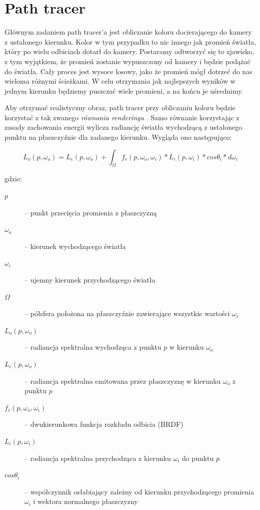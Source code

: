 \documentclass[inz,longabstract]{iithesis}
\begin{document}
    \section{Path tracer}
        Głównym zadaniem path tracer'a jest obliczanie koloru docierającego do kamery z ustalonego kierunku. Kolor w tym przypadku to nic innego jak promień światła, który po wielu odbiciach dotarł do kamery. Postaramy odtworzyć się to zjawisko, z tym wyjątkiem, że promień zostanie wypuszczony od kamery i będzie podążać do światła. Cały proces jest wysoce losowy, jako że promień mógł dotrzeć do nas wieloma różnymi ścieżkami. W celu otrzymania jak najlepszych wyników w jednym kierunku będziemy puszczać wiele promieni, a na końcu je uśrednimy.
        
        Aby otrzymać realistyczny obraz, path tracer przy obliczaniu koloru będzie korzystać z tak zwanego \textit{równania renderingu} \cite{pbrt}. Samo równanie korzystając z zasady zachowania energii wylicza radiancję światła wychodzącą z ustalonego punktu na płaszczyźnie dla zadanego kierunku. Wygląda ono następująco:
        
        \begin{equation*}
            L_o(p, \omega_o) = L_e(p, \omega_o) + \int_{\Omega} f_r(p, \omega_o, \omega_i) * L_i(p, \omega_i)*cos\theta_i*d\omega_i
        \end{equation*}
        
        gdzie:
        
        \begin{description}
            \item[$p$] -- punkt przecięcia promienia z płaszczyzną
            \item[$\omega_o$] -- kierunek wychodzącego światła
            \item[$\omega_i$] -- ujemny kierunek przychodzącego światła
            \item[$\Omega$] -- półsfera położona na płaszczyźnie zawierające wszystkie wartości $\omega_i$ 
            \item[$L_o(p, \omega_o)$] -- radiancja spektralna wychodząca z punktu $p$ w kierunku $\omega_o$
            \item[$L_e(p, \omega_o)$] -- radiancja spektralna emitowana przez płaszczyznę w kierunku $\omega_o$ z punktu $p$  
            \item[$f_r(p, \omega_o, \omega_i)$] -- dwukierunkowa funkcja rozkładu odbicia (BRDF)
            \item[$L_i(p, \omega_i)$] -- radiancja spektralna przychodząca z kierunku $\omega_i$ do punktu $p$
            \item[$cos\theta_i$] -- współczynnik osłabiający zależny od kierunku przychodzącego promienia $\omega_i$ i wektora normalnego płaszczyzny
        \end{description}
\end{document}
